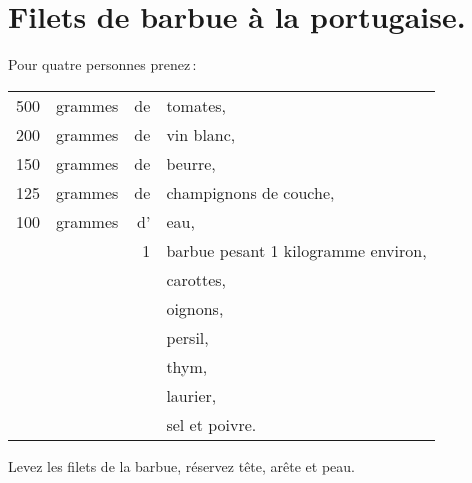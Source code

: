 \section*{\centering Filets de barbue à la portugaise.}

Pour quatre personnes prenez :

\medskip

\footnotesize
\begin{longtable}{rrrp{16em}}
    500 & grammes & de & tomates,                                                                         \\
    200 & grammes & de & vin blanc,                                                                       \\
    150 & grammes & de & beurre,                                                                          \\
    125 & grammes & de & champignons de couche,                                                           \\
    100 & grammes & d' & eau,                                                                             \\
        &         &  1 & barbue pesant 1 kilogramme environ,                                              \\
        &         &    & carottes,                                                                        \\
        &         &    & oignons,                                                                         \\
        &         &    & persil,                                                                          \\
        &         &    & thym,                                                                            \\
        &         &    & laurier,                                                                         \\
        &         &    & sel et poivre.                                                                   \\
\end{longtable}
\normalsize

Levez les filets de la barbue, réservez tête, arête et peau.

